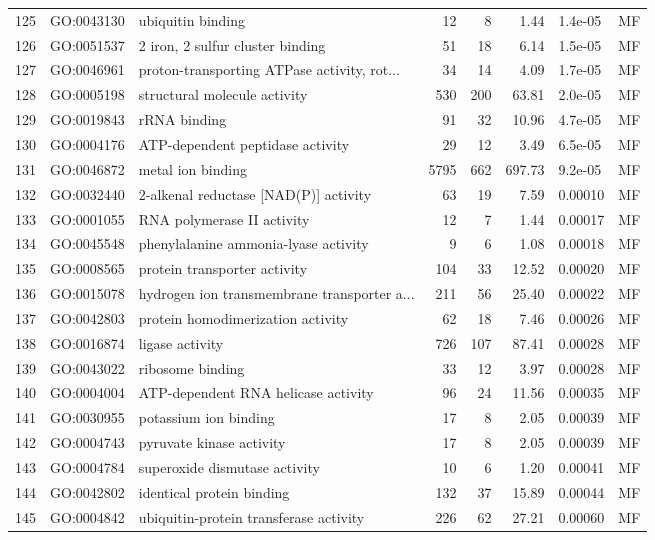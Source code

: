 \documentclass[12pt,oneside,a4paper]{article}
\begin{document}
\begin{longtable}{rllrrrll}
  125 & GO:0043130 & ubiquitin binding &  12 &   8 & 1.44 & 1.4e-05 & MF \\ 
  126 & GO:0051537 & 2 iron, 2 sulfur cluster binding &  51 &  18 & 6.14 & 1.5e-05 & MF \\ 
  127 & GO:0046961 & proton-transporting ATPase activity, rot... &  34 &  14 & 4.09 & 1.7e-05 & MF \\ 
  128 & GO:0005198 & structural molecule activity & 530 & 200 & 63.81 & 2.0e-05 & MF \\ 
  129 & GO:0019843 & rRNA binding &  91 &  32 & 10.96 & 4.7e-05 & MF \\ 
  130 & GO:0004176 & ATP-dependent peptidase activity &  29 &  12 & 3.49 & 6.5e-05 & MF \\ 
  131 & GO:0046872 & metal ion binding & 5795 & 662 & 697.73 & 9.2e-05 & MF \\ 
  132 & GO:0032440 & 2-alkenal reductase [NAD(P)] activity &  63 &  19 & 7.59 & 0.00010 & MF \\ 
  133 & GO:0001055 & RNA polymerase II activity &  12 &   7 & 1.44 & 0.00017 & MF \\ 
  134 & GO:0045548 & phenylalanine ammonia-lyase activity &   9 &   6 & 1.08 & 0.00018 & MF \\ 
  135 & GO:0008565 & protein transporter activity & 104 &  33 & 12.52 & 0.00020 & MF \\ 
  136 & GO:0015078 & hydrogen ion transmembrane transporter a... & 211 &  56 & 25.40 & 0.00022 & MF \\ 
  137 & GO:0042803 & protein homodimerization activity &  62 &  18 & 7.46 & 0.00026 & MF \\ 
  138 & GO:0016874 & ligase activity & 726 & 107 & 87.41 & 0.00028 & MF \\ 
  139 & GO:0043022 & ribosome binding &  33 &  12 & 3.97 & 0.00028 & MF \\ 
  140 & GO:0004004 & ATP-dependent RNA helicase activity &  96 &  24 & 11.56 & 0.00035 & MF \\ 
  141 & GO:0030955 & potassium ion binding &  17 &   8 & 2.05 & 0.00039 & MF \\ 
  142 & GO:0004743 & pyruvate kinase activity &  17 &   8 & 2.05 & 0.00039 & MF \\ 
  143 & GO:0004784 & superoxide dismutase activity &  10 &   6 & 1.20 & 0.00041 & MF \\ 
  144 & GO:0042802 & identical protein binding & 132 &  37 & 15.89 & 0.00044 & MF \\ 
  145 & GO:0004842 & ubiquitin-protein transferase activity & 226 &  62 & 27.21 & 0.00060 & MF \\ 

\end{longtable}
\end{document}
